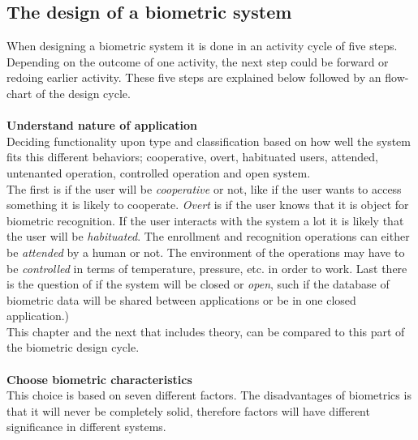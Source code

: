 \subsection{The design of a biometric system}
When designing a biometric system it is done in an activity cycle of five steps. Depending on the outcome of one activity, the next step could be forward or redoing earlier activity. These five steps are explained below followed by an flow-chart of the design cycle.\\
\\
\textbf{Understand nature of application}\\
Deciding functionality upon type and classification based on how well the system fits this different behaviors; cooperative, overt, habituated users, attended, untenanted operation, controlled operation and open system. \\
The first is if the user will be \textit{cooperative} or not, like if the user wants to access something it is likely to cooperate. \textit{Overt} is if the user knows that it is object for biometric recognition. If the user interacts with the system a lot it is likely that the user will be \textit{habituated}. The enrollment and recognition operations can either be \textit{attended} by a human or not. The environment of the operations may have to be \textit{controlled} in terms of temperature, pressure, etc. in order to work. Last there is the question of if the system will be closed or \textit{open}, such if the database of biometric data will be shared between applications or be in one closed application.) \\
This chapter and the next that includes theory, can be compared to this part of the biometric design cycle.\\
\\
\textbf{Choose biometric characteristics }\label{auth:bio:character}\\ 
This choice is based on seven different factors. The disadvantages of biometrics is that it will never be completely solid, therefore factors will have different significance in different systems.
